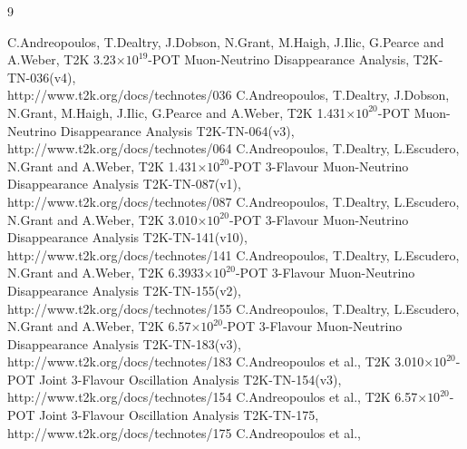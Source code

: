 \clearpage
%
%


\begin{thebibliography}{9}

%
%
   C.Andreopoulos, T.Dealtry, J.Dobson, N.Grant, M.Haigh, J.Ilic, G.Pearce and A.Weber,
   T2K 3.23$\times10^{19}$-POT Muon-Neutrino Disappearance Analysis,
   T2K-TN-036(v4),\\
   http://www.t2k.org/docs/technotes/036
   C.Andreopoulos, T.Dealtry, J.Dobson, N.Grant, M.Haigh, J.Ilic, G.Pearce and A.Weber,
   T2K 1.431$\times10^{20}$-POT Muon-Neutrino Disappearance Analysis
   T2K-TN-064(v3),\\
   http://www.t2k.org/docs/technotes/064
   C.Andreopoulos, T.Dealtry, L.Escudero, N.Grant and A.Weber,
   T2K 1.431$\times10^{20}$-POT 3-Flavour Muon-Neutrino Disappearance Analysis
   T2K-TN-087(v1),\\
   http://www.t2k.org/docs/technotes/087
   C.Andreopoulos, T.Dealtry, L.Escudero, N.Grant and A.Weber,
   T2K 3.010$\times10^{20}$-POT 3-Flavour Muon-Neutrino Disappearance Analysis
   T2K-TN-141(v10),\\
   http://www.t2k.org/docs/technotes/141
   C.Andreopoulos, T.Dealtry, L.Escudero, N.Grant and A.Weber,
   T2K 6.3933$\times10^{20}$-POT 3-Flavour Muon-Neutrino Disappearance Analysis
   T2K-TN-155(v2),\\
   http://www.t2k.org/docs/technotes/155
   C.Andreopoulos, T.Dealtry, L.Escudero, N.Grant and A.Weber,
   T2K 6.57$\times10^{20}$-POT 3-Flavour Muon-Neutrino Disappearance Analysis
   T2K-TN-183(v3),\\
   http://www.t2k.org/docs/technotes/183
   C.Andreopoulos et al.,
   T2K 3.010$\times10^{20}$-POT Joint 3-Flavour Oscillation Analysis
   T2K-TN-154(v3),\\
   http://www.t2k.org/docs/technotes/154
   C.Andreopoulos et al.,
   T2K 6.57$\times10^{20}$-POT Joint 3-Flavour Oscillation Analysis
   T2K-TN-175,\\
   http://www.t2k.org/docs/technotes/175
   C.Andreopoulos et al.,

\end{thebibliography}
